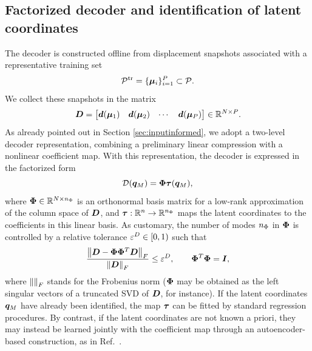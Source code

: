 \documentclass[preprint,10pt]{elsarticle}  %
\begin{document}
\subsection{Factorized decoder and identification of latent coordinates}
\label{sec:fact}
The decoder is constructed offline from displacement snapshots associated
with a representative training set
\begin{equation}
\label{eq:pmutrain}
  \mathcal{P}^{\textrm{tr}} = \{\bm{\mu}_i\}_{i=1}^{P}\subset\mathcal{P}.
\end{equation}
We collect these snapshots in
the matrix
\begin{equation}
\label{eq:manifold_snapshot_matrix}
\bm{D} =
\begin{bmatrix}
\bm{d}(\bm{\mu}_1) &
\bm{d}(\bm{\mu}_2) &
\cdots &
\bm{d}(\bm{\mu}_{P})
\end{bmatrix}
\in\mathbb{R}^{N\times P}.
\end{equation}
 As already pointed out in Section \ref{sec:inputinformed},    we adopt a two-level decoder
representation, combining a preliminary linear compression with a
nonlinear coefficient map. With
this representation, the decoder is expressed in the factorized form
\begin{equation}
\label{eq:decoder_tau_generic}
\mathcal{\boldsymbol{D}}(\bm{q}_M)
=
\bm{\Phi}\bm{\tau}(\bm{q}_M),
\end{equation}
where  \(\bm{\Phi}\in\mathbb{R}^{N \times n_{\Phi}}\)  is    an orthonormal basis matrix for a
low-rank approximation of the column space of \(\bm{D}\), and  \(\bm{\tau}:\mathbb{R}^{n}\rightarrow\mathbb{R}^{n_{\Phi}}\) maps the latent
coordinates to the coefficients in this linear basis.
As customary, the number of modes $n_{\Phi}$ in $\bm{\Phi}$ is controlled by a relative tolerance $\varepsilon^D \in [0,1)$ such that
\begin{equation}
\label{eq:PhiROM_truncation}
\frac{
\left\lVert \bm{D}-\bm{\Phi}\bm{\Phi}^T\bm{D} \right\rVert_F
}{
\left\lVert \bm{D} \right\rVert_F
}
\leq
\varepsilon^D, \qquad  \bm{\Phi}^T \bm{\Phi} = \bm{I},
\end{equation}
where $\left\lVert  \right\rVert_F$ stands for the Frobenius norm   ($\bm{\Phi}$ may be obtained as the left singular vectors of  a truncated  SVD of \(\bm{D}\), for instance).
If the latent coordinates \(\bm{q}_M\) have already been identified, the map
\(\bm{\tau}\) can be fitted by standard regression procedures. By contrast, if the latent coordinates are not known a priori, they may instead be
learned jointly with the coefficient map through an autoencoder-based
construction, as in Ref.~\cite{fresca2022pod}.
\end{document}
